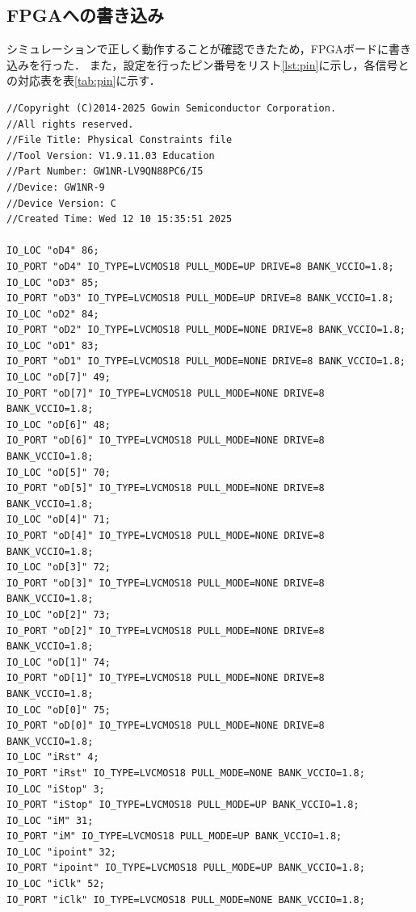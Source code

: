 \documentclass[a4paper,11pt]{ltjsarticle}
\begin{document}
\subsection{FPGAへの書き込み}
シミュレーションで正しく動作することが確認できたため，FPGAボードに書き込みを行った．
また，設定を行ったピン番号をリスト\ref{lst:pin}に示し，各信号との対応表を表\ref{tab:pin}に示す．
\begin{lstlisting}[caption=FPGAピン設定コード,label=lst:pin]
//Copyright (C)2014-2025 Gowin Semiconductor Corporation.
//All rights reserved. 
//File Title: Physical Constraints file
//Tool Version: V1.9.11.03 Education
//Part Number: GW1NR-LV9QN88PC6/I5
//Device: GW1NR-9
//Device Version: C
//Created Time: Wed 12 10 15:35:51 2025

IO_LOC "oD4" 86;
IO_PORT "oD4" IO_TYPE=LVCMOS18 PULL_MODE=UP DRIVE=8 BANK_VCCIO=1.8;
IO_LOC "oD3" 85;
IO_PORT "oD3" IO_TYPE=LVCMOS18 PULL_MODE=UP DRIVE=8 BANK_VCCIO=1.8;
IO_LOC "oD2" 84;
IO_PORT "oD2" IO_TYPE=LVCMOS18 PULL_MODE=NONE DRIVE=8 BANK_VCCIO=1.8;
IO_LOC "oD1" 83;
IO_PORT "oD1" IO_TYPE=LVCMOS18 PULL_MODE=NONE DRIVE=8 BANK_VCCIO=1.8;
IO_LOC "oD[7]" 49;
IO_PORT "oD[7]" IO_TYPE=LVCMOS18 PULL_MODE=NONE DRIVE=8 BANK_VCCIO=1.8;
IO_LOC "oD[6]" 48;
IO_PORT "oD[6]" IO_TYPE=LVCMOS18 PULL_MODE=NONE DRIVE=8 BANK_VCCIO=1.8;
IO_LOC "oD[5]" 70;
IO_PORT "oD[5]" IO_TYPE=LVCMOS18 PULL_MODE=NONE DRIVE=8 BANK_VCCIO=1.8;
IO_LOC "oD[4]" 71;
IO_PORT "oD[4]" IO_TYPE=LVCMOS18 PULL_MODE=NONE DRIVE=8 BANK_VCCIO=1.8;
IO_LOC "oD[3]" 72;
IO_PORT "oD[3]" IO_TYPE=LVCMOS18 PULL_MODE=NONE DRIVE=8 BANK_VCCIO=1.8;
IO_LOC "oD[2]" 73;
IO_PORT "oD[2]" IO_TYPE=LVCMOS18 PULL_MODE=NONE DRIVE=8 BANK_VCCIO=1.8;
IO_LOC "oD[1]" 74;
IO_PORT "oD[1]" IO_TYPE=LVCMOS18 PULL_MODE=NONE DRIVE=8 BANK_VCCIO=1.8;
IO_LOC "oD[0]" 75;
IO_PORT "oD[0]" IO_TYPE=LVCMOS18 PULL_MODE=NONE DRIVE=8 BANK_VCCIO=1.8;
IO_LOC "iRst" 4;
IO_PORT "iRst" IO_TYPE=LVCMOS18 PULL_MODE=NONE BANK_VCCIO=1.8;
IO_LOC "iStop" 3;
IO_PORT "iStop" IO_TYPE=LVCMOS18 PULL_MODE=UP BANK_VCCIO=1.8;
IO_LOC "iM" 31;
IO_PORT "iM" IO_TYPE=LVCMOS18 PULL_MODE=UP BANK_VCCIO=1.8;
IO_LOC "ipoint" 32;
IO_PORT "ipoint" IO_TYPE=LVCMOS18 PULL_MODE=UP BANK_VCCIO=1.8;
IO_LOC "iClk" 52;
IO_PORT "iClk" IO_TYPE=LVCMOS18 PULL_MODE=NONE BANK_VCCIO=1.8;

\end{lstlisting}
\end{document}
